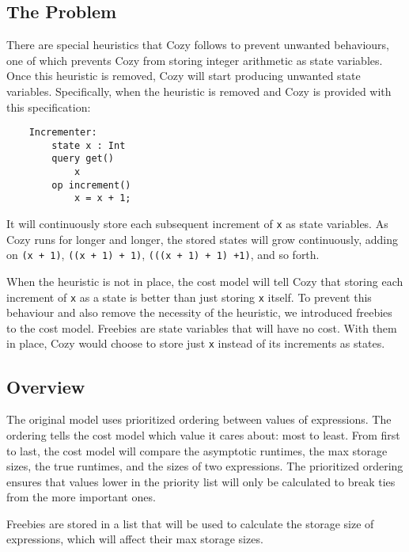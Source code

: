 \newcommand{\code}[1]{\texttt{#1}}

\subsection{The Problem}
There are special heuristics that Cozy follows to prevent unwanted behaviours,
one of which prevents Cozy from storing integer arithmetic as state variables.
Once this heuristic is removed, Cozy will start producing unwanted state
variables. Specifically, when the heuristic is removed and Cozy is provided with
this specification:

\begin{center}
\begin{lstlisting}
    Incrementer:
        state x : Int
        query get()
            x
        op increment()
            x = x + 1;
\end{lstlisting}
\end{center}

It will continuously store each subsequent increment of \code{x} as state
variables. As Cozy runs for longer and longer, the stored states will grow
continuously, adding on \code{(x + 1)}, \code{((x + 1) + 1)},
\code{(((x + 1) + 1) +1)}, and so forth.

When the heuristic is not in place, the cost model will tell Cozy that storing
each increment of \code{x} as a state is better than just storing \code{x}
itself. To prevent this behaviour and also remove the necessity of the
heuristic, we introduced freebies to the cost model. Freebies are state
variables that will have no cost. With them in place, Cozy would choose to store
just \code{x} instead of its increments as states.

\subsection{Overview}
The original model uses prioritized ordering between values of expressions. The
ordering tells the cost model which value it cares about: most to least. From
first to last, the cost model will compare the asymptotic runtimes, the max
storage sizes, the true runtimes, and the sizes of two expressions. The
prioritized ordering ensures that values lower in the priority list will only be
calculated to break ties from the more important ones.

Freebies are stored in a list that will be used to calculate the storage size of
expressions, which will affect their max storage sizes.

